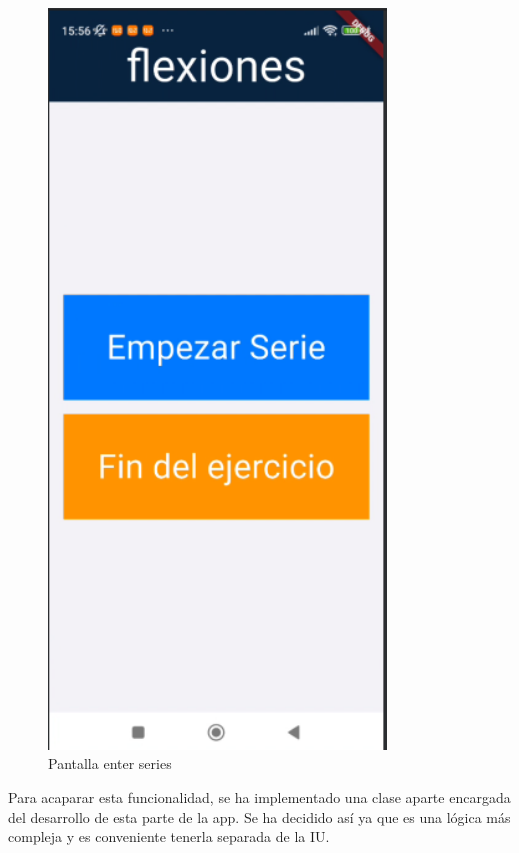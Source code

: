 \begin{figure}[H]
   \centering
    \includegraphics[width=0.8\textwidth]{pantallas/entreSerie.png}
    \caption{Pantalla enter series}
    \label{fig:entreSerie}
\end{figure}

Para acaparar esta funcionalidad, se ha implementado una clase aparte encargada del desarrollo de esta parte de la app. Se ha decidido así ya que es una lógica más compleja y es conveniente tenerla separada de la IU.

